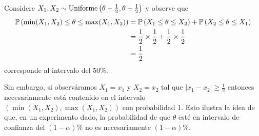 \begin{example} Considere $X_1,X_2\sim\text{Uniforme}\left(\theta-\tfrac{1}{2},\theta+\tfrac{1}{2}\right)$ y observe que 
\begin{align*}
	\mathbb{P} \left(\min(X_1,X_2) \leq \theta \leq \max(X_1,X_2)\right) 
		&= \mathbb{P} \left( X_1 \leq \theta \leq X_2\right)  + \mathbb{P} \left( X_2 \leq \theta \leq X_1\right) \\
		&= \frac{1}{2}\times \frac{1}{2} + \frac{1}{2}\times\frac{1}{2}\\
		&= \frac{1}{2}
\end{align*}
corresponde al intervalo del 50\%. 

Sin embargo, si observáramos $X_1 = x_1$ y $X_2 = x_2$ tal que $|x_1-x_2|\geq\tfrac{1}{2}$ entonces necesariamente está contenido en el intervalo $(\min(X_1,X_2) , \max(X_1,X_2))$ con probabilidad 1. Esto ilustra la idea de que, en un experimento dado, la probabilidad de que $\theta$ esté en intervalo de confianza del $(1-\alpha)$\% no es necesariamente $(1-\alpha)$\%.
\end{example}

